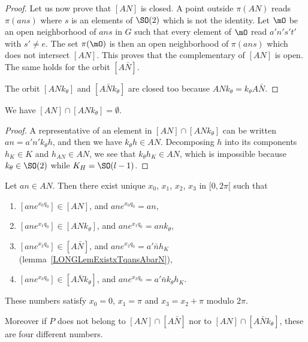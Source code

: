 \begin{proof}
	Let us now prove that $[AN]$ is closed. A point outside $\pi(AN)$ reads $\pi(ans)$ where $s$ is an elements of $\SO(2)$ which is not the identity. Let $\mO$ be an open neighborhood of $ans$ in $G$ such that every element of $\mO$ read $a'n's't'$ with $s'\neq e$. The set $\pi(\mO)$ is then an open neighborhood of $\pi(ans)$ which does not intersect $[AN]$. This proves that the complementary of $[AN]$ is open. The same holds for the orbit $[A\bar N]$.

	The orbit $[ANk_{\theta}]$ and $[A\bar Nk_{\theta}]$ are closed too because $ANk_{\theta}=k_{\theta}A\bar N$.

\end{proof}

%
\begin{lemma}
	We have $[AN]\cap[ANk_{\theta}]=\emptyset$.
\end{lemma}

\begin{proof}
	A representative of an element in $[AN]\cap[ANk_{\theta}]$ can be written $an=a'n'k_{\theta}h$, and then we have $k_{\theta}h\in AN$. Decomposing $h$ into its components $h_K\in K$ and $h_{AN}\in AN$, we see that $k_{\theta}h_K\in AN$, which is impossible because $k_{\theta}\in\SO(2)$ while $K_H=\SO(l-1)$.
\end{proof}

\begin{proposition}        \label{LONGPropUniquexxxxANANbarktheta}
	Let $an\in AN$. Then there exist unique $x_0$, $x_1$, $x_2$, $x_3$ in $\mathopen[ 0 , 2\pi [$ such that
	\begin{enumerate}
		\item
		      $[an e^{x_0q_0}]\in[AN]$, and $an e^{x_0q_0}=an$,
		\item
		      $[an e^{x_1q_0}]\in[ANk_{\theta}]$, and $an e^{x_1q_0}=ank_{\theta}$,
		\item
		      $[an e^{x_2q_0}]\in[A\bar N]$, and $an e^{x_2q_0}=a'\bar n h_K$ (lemma~\ref{LONGLemExistxTqansAbarN}),
		\item
		      $[an e^{x_3q_0}]\in[A\bar Nk_{\theta}]$, and $an e^{x_3q_0}=a'\bar nk_{\theta}h_K$.
	\end{enumerate}
	These numbers satisfy $x_0=0$, $x_1=\pi$ and $x_3=x_2+\pi$ modulo $2\pi$.

	Moreover if $P$ does not belong to $[AN]\cap[A\bar N]$ nor to $[AN]\cap[A\bar Nk_{\theta}]$, these are four different numbers.
\end{proposition}


